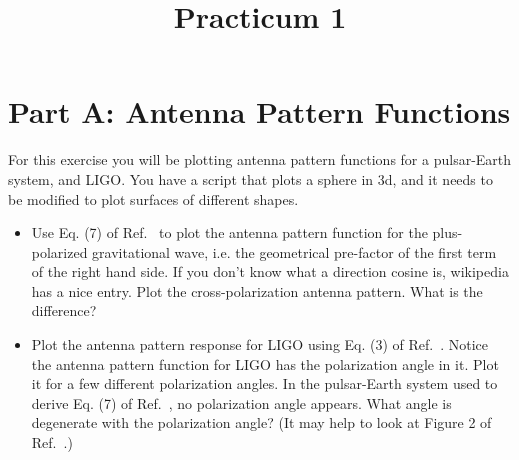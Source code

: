 \documentclass[prd,floatfix,preprintnumbers,amsmath,amssymb,nofootinbib,superscriptaddress]{revtex4}
\begin{document}
\title{Practicum 1}

\maketitle

\section*{Part A: Antenna Pattern Functions}

For this exercise you will be plotting antenna pattern functions for a pulsar-Earth system, and LIGO. 
You have a script that plots a sphere in 3d, and it needs to be modified to plot surfaces of different shapes.


\begin{itemize}

\item Use Eq. (7) of Ref.~\cite{Anholm} to plot the antenna pattern function for the plus-polarized gravitational wave, 
i.e. the geometrical pre-factor of the first term of the right hand side. If you don't know what a 
direction cosine is, wikipedia has a nice entry. Plot the cross-polarization antenna pattern. What is the difference?

\item Plot the antenna pattern response for LIGO using Eq. (3) of Ref.~\cite{Kazu}. Notice the antenna pattern 
function for LIGO has the polarization angle in it.  Plot it for a few different polarization angles. In the 
pulsar-Earth system used to derive Eq. (7) of Ref.~\cite{Anholm}, no polarization angle appears. 
What angle is degenerate with the polarization angle? (It may help to look at Figure 2 of Ref.~\cite{Kazu}.)


\end{itemize}
\end{document}
